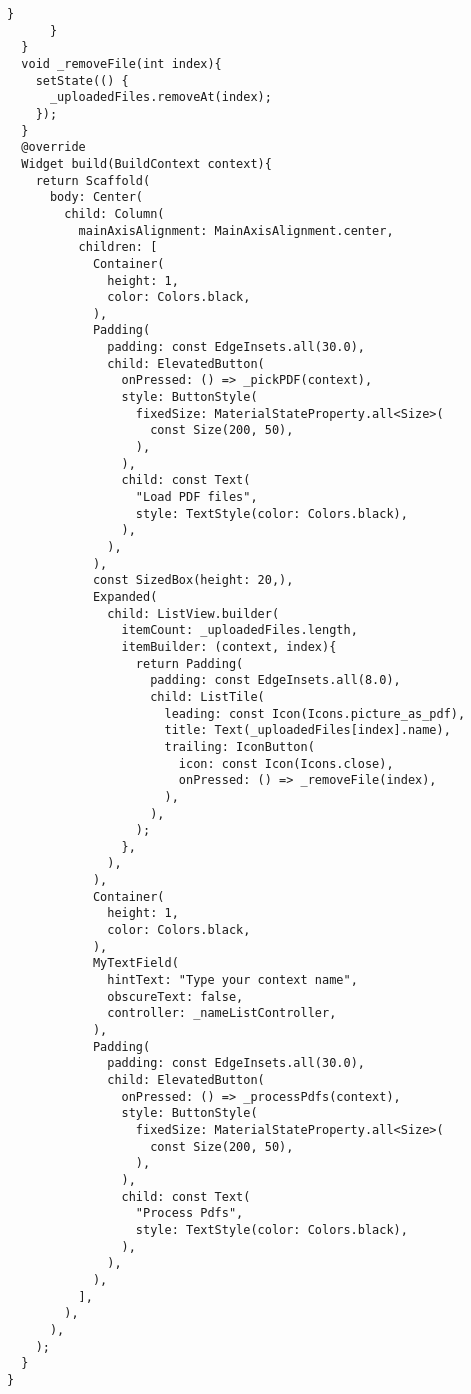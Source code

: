 \begin{lstlisting}[style=pythonstyle,caption={Codice del my\_pdf\_uploader.dart}, label={lst:MyPdfUploader}]
        }
      }
  }
  void _removeFile(int index){
    setState(() {
      _uploadedFiles.removeAt(index);
    });
  }
  @override
  Widget build(BuildContext context){
    return Scaffold(
      body: Center(
        child: Column(
          mainAxisAlignment: MainAxisAlignment.center,
          children: [
            Container(
              height: 1,
              color: Colors.black,
            ),
            Padding(
              padding: const EdgeInsets.all(30.0),
              child: ElevatedButton(
                onPressed: () => _pickPDF(context),
                style: ButtonStyle(
                  fixedSize: MaterialStateProperty.all<Size>(
                    const Size(200, 50),
                  ),
                ),
                child: const Text(
                  "Load PDF files",
                  style: TextStyle(color: Colors.black),
                ),
              ),
            ),
            const SizedBox(height: 20,),
            Expanded(
              child: ListView.builder(
                itemCount: _uploadedFiles.length,  
                itemBuilder: (context, index){
                  return Padding(
                    padding: const EdgeInsets.all(8.0),
                    child: ListTile(
                      leading: const Icon(Icons.picture_as_pdf),
                      title: Text(_uploadedFiles[index].name),
                      trailing: IconButton(
                        icon: const Icon(Icons.close),
                        onPressed: () => _removeFile(index), 
                      ),
                    ),
                  );
                },
              ),
            ),
            Container(
              height: 1,
              color: Colors.black,
            ),
            MyTextField(
              hintText: "Type your context name",
              obscureText: false,
              controller: _nameListController,
            ),
            Padding(
              padding: const EdgeInsets.all(30.0),
              child: ElevatedButton(
                onPressed: () => _processPdfs(context),
                style: ButtonStyle(
                  fixedSize: MaterialStateProperty.all<Size>(
                    const Size(200, 50),
                  ),
                ),
                child: const Text(
                  "Process Pdfs",
                  style: TextStyle(color: Colors.black),
                ),
              ),
            ),
          ],
        ),
      ),
    );
  }
}
\end{lstlisting}
